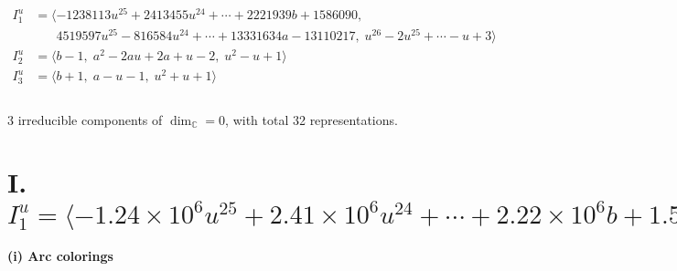 \documentclass[1p]{elsarticle_modified}
\theoremstyle{definition}
\begin{document}
\begin{align*}
I^u_{1}&=\langle 
-1238113 u^{25}+2413455 u^{24}+\cdots+2221939 b+1586090,\\
\phantom{I^u_{1}}&\phantom{= \langle  }4519597 u^{25}-816584 u^{24}+\cdots+13331634 a-13110217,\;u^{26}-2 u^{25}+\cdots- u+3\rangle \\
I^u_{2}&=\langle 
b-1,\;a^2-2 a u+2 a+u-2,\;u^2- u+1\rangle \\
I^u_{3}&=\langle 
b+1,\;a- u-1,\;u^2+u+1\rangle \\
\\
\end{align*}
\raggedright * 3 irreducible components of $\dim_{\mathbb{C}}=0$, with total 32 representations.\\
\newpage
\renewcommand{\arraystretch}{1}
\centering \section*{I. $I^u_{1}= \langle -1.24\times10^{6} u^{25}+2.41\times10^{6} u^{24}+\cdots+2.22\times10^{6} b+1.59\times10^{6},\;4.52\times10^{6} u^{25}-8.17\times10^{5} u^{24}+\cdots+1.33\times10^{7} a-1.31\times10^{7},\;u^{26}-2 u^{25}+\cdots- u+3 \rangle$}
\flushleft \textbf{(i) Arc colorings}\\
\end{document}
